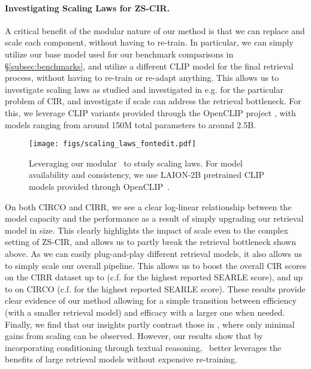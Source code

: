 \documentclass{article} \usepackage{iclr2024_conference,times}
\begin{document}
\paragraph{Investigating Scaling Laws for ZS-CIR.} A critical benefit of the modular nature of our method is that we can replace and scale each component, without having to re-train. In particular, we can simply utilize our base model used for our benchmark comparisons in \S\ref{subsec:benchmarks}, and utilize a different CLIP model for the final retrieval process, without having to re-train or re-adapt anything.
This allows us to investigate scaling laws as studied and investigated in e.g. \citet{kaplan2020scaling,caballero2022broken,cherti2023reproducible} for the particular problem of CIR, and investigate if scale can address the retrieval bottleneck.
For this, we leverage CLIP variants provided through the OpenCLIP project \citep{openclip}, with models ranging from around 150M total parameters to around 2.5B. 
\begin{figure}[t]
    \centering
    \texttt{[image: figs/scaling\_laws\_fontedit.pdf]}
    \vspace{-23pt}
    \caption{Leveraging our modular \methodNameNS\ to study scaling laws. For model availability and consistency, 
    we use LAION-2B pretrained CLIP models provided through OpenCLIP~\citep{openclip}.}
    \label{fig:scaling_laws}
\vspace{-8pt}
\end{figure} On both CIRCO and CIRR, we see a clear log-linear relationship between the model capacity and the performance as a result of simply upgrading our retrieval model in size. This clearly highlights the impact of scale even to the complex setting of ZS-CIR, and allows us to partly break the retrieval bottleneck shown above.
As we can easily plug-and-play different retrieval models, it also allows us to simply scale our overall pipeline. This allows us to boost the overall CIR scores on the CIRR dataset up to  (c.f.  for the highest reported SEARLE score), and up to  on CIRCO (c.f.  for the highest reported SEARLE score).
These results provide clear evidence of our method allowing for a simple transition between efficiency (with a smaller retrieval model) and efficacy with a larger one when needed.
Finally, we find that our insights partly contrast those in \cite{vaze2023genecis}, where only minimal gains from scaling can be observed. However, our results show that by incorporating conditioning through textual reasoning, \methodNameNS\  better leverages the benefits of large retrieval models without expensive re-training.
\end{document}
